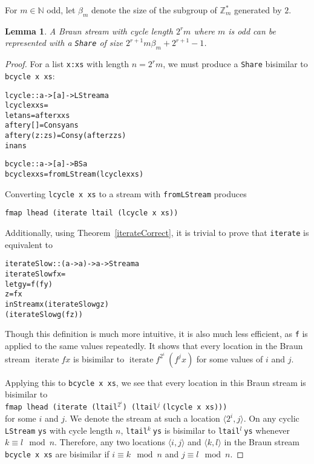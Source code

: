 \documentclass{llncs}
\DeclareMathOperator{\iter}{iterate}
\newtheorem{lemma}[theorem]{Lemma}
\begin{document}
For $m \in \mathbb{N}$ odd, let $\beta_m$ denote the size of the subgroup of $\mathbb{Z}_m^*$ generated by $2$.
\begin{lemma}
\label{cycleSize}
A Braun stream with cycle length $2^r m$ where $m$ is odd can be represented with a {\tt Share} of size $2^{r+1} m \beta_m + 2^{r+1} - 1$.
\end{lemma}
\begin{proof}
For a list {\tt x:xs} with length $n = 2^r m$, we must produce a {\tt Share} bisimilar to {\tt bcycle x xs}:

\begin{alltt}
lcycle :: a -> [a] -> LStream a
lcycle x xs = 
  let ans = after x xs
      after y [] = Cons y ans
      after y (z:zs) = Cons y (after z zs)
  in ans

bcycle :: a -> [a] -> BS a
bcycle x xs = fromLStream (lcycle x xs)
\end{alltt}

Converting {\tt lcycle x xs} to a stream with {\tt fromLStream} produces 

{\tt fmap lhead (iterate ltail (lcycle x xs))}

Additionally, using Theorem~\ref{iterateCorrect}, it is trivial to prove that {\tt iterate} is equivalent to

\begin{alltt}
iterateSlow :: (a -> a) -> a -> Stream a
iterateSlow f x =
  let g y = f (f y)
      z = f x
  in Stream x (iterateSlow g    z) 
              (iterateSlow g (f z))
\end{alltt}

Though this definition is much more intuitive, it is also much less efficient, as {\tt f} is applied to the same values repeatedly.
It shows that every location in the Braun stream $\iter f x$ is bisimilar to $\iter f^{2^i}\ (f^j x)$ for some values of $i$ and $j$.

Applying this to {\tt bcycle x xs}, we see that every location in this Braun stream is bisimilar to 
\\
{\tt fmap lhead (iterate (ltail}$^{2^i}${\tt ) (ltail}$^j\ ${\tt (lcycle x xs)))} 
\\
for some $i$ and $j$.
We denote the stream at such a location $\langle 2^i,j \rangle$.
On any cyclic {\tt LStream} {\tt ys} with cycle length $n$, {\tt ltail}$^k\ ${\tt ys} is bisimilar to {\tt ltail}$^l\ ${\tt ys} whenever $k \equiv l \mod n$.
Therefore, any two locations $\langle i,j \rangle$ and $\langle k,l \rangle$ in the Braun stream {\tt bcycle x xs} are bisimilar if $i \equiv k \mod n$ and $j \equiv l \mod n$.


\end{proof}
\end{document}
